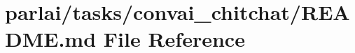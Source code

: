 \hypertarget{parlai_2tasks_2convai__chitchat_2README_8md}{}\section{parlai/tasks/convai\+\_\+chitchat/\+R\+E\+A\+D\+ME.md File Reference}
\label{parlai_2tasks_2convai__chitchat_2README_8md}
